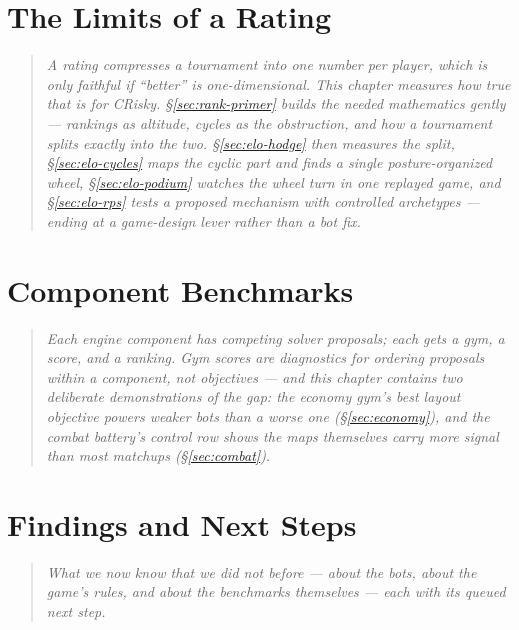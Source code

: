 \documentclass[11pt]{report}
\newcommand{\chapterlead}[1]{%
  \begin{quote}\itshape #1\end{quote}\medskip}
\begin{document}
\chapter{The Limits of a Rating}
\label{ch:limits}
\chapterlead{A rating compresses a tournament into one number per player,
which is only faithful if ``better'' is one-dimensional. This chapter
measures how true that is for CRisky. \S\ref{sec:rank-primer} builds the
needed mathematics gently --- rankings as altitude, cycles as the
obstruction, and how a tournament splits exactly into the two.
\S\ref{sec:elo-hodge} then measures the split, \S\ref{sec:elo-cycles} maps
the cyclic part and finds a single posture-organized wheel,
\S\ref{sec:elo-podium} watches the wheel turn in one replayed game, and
\S\ref{sec:elo-rps} tests a proposed mechanism with controlled archetypes
--- ending at a game-design lever rather than a bot fix.}


\chapter{Component Benchmarks}
\label{ch:components}
\chapterlead{Each engine component has competing solver proposals; each
gets a gym, a score, and a ranking. Gym scores are diagnostics for ordering
proposals within a component, not objectives --- and this chapter contains
two deliberate demonstrations of the gap: the economy gym's best layout
objective powers weaker bots than a worse one (\S\ref{sec:economy}), and
the combat battery's control row shows the maps themselves carry more
signal than most matchups (\S\ref{sec:combat}).}





\chapter{Findings and Next Steps}
\label{ch:findings}
\label{sec:open}
\chapterlead{What we now know that we did not before --- about the bots,
about the game's rules, and about the benchmarks themselves --- each with
its queued next step.}
\end{document}
